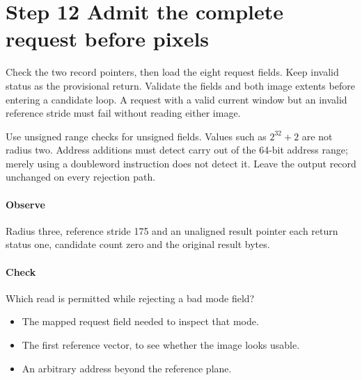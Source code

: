 \section{Step 12 Admit the complete request before pixels}\label{h263-motion-s02}
Check the two record pointers, then load the eight request fields. Keep invalid
status as the provisional return. Validate the fields and both image extents
before entering a candidate loop. A request with a valid current window but an
invalid reference stride must fail without reading either image.

Use unsigned range checks for unsigned fields. Values such as
$2^{32}+2$ are not radius two. Address additions must detect carry out of the
64-bit address range; merely using a doubleword instruction does not detect it.
Leave the output record unchanged on every rejection path.

\paragraph{Observe} Radius three, reference stride 175 and an unaligned result
pointer each return status one, candidate count zero and the original result bytes.
\paragraph{Check} Which read is permitted while rejecting a bad mode field?
\begin{itemize}
  \item[A.] The mapped request field needed to inspect that mode.
  \item[B.] The first reference vector, to see whether the image looks usable.
  \item[C.] An arbitrary address beyond the reference plane.
\end{itemize}
